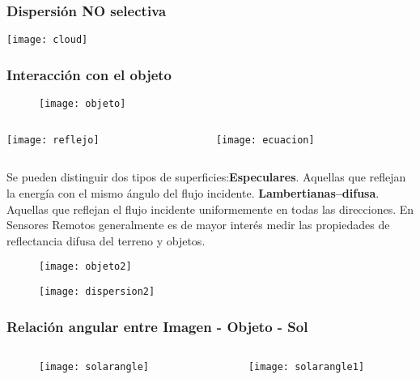 \documentclass[]{beamer}
\begin{document}
\begin{frame}
\frametitle{Dispersión NO selectiva}
\begin{center} 
\texttt{[image: cloud]}
\end{center}
\end{frame}
\begin{frame}
\frametitle{Interacción con el objeto}
  \begin{figure}
    \centering
    \texttt{[image: objeto]}
  \end{figure}
  \begin{columns}
	 	\begin{column}{.5\linewidth}
		 \texttt{[image: reflejo]}
		\end{column}
		\begin{column}{.5\linewidth}
		\texttt{[image: ecuacion]}
		\end{column}
	\end{columns}
\tiny{}
\end{frame}
\begin{frame}
\scriptsize{Se pueden distinguir dos tipos de superficies:\vfill\textbf{Especulares}. Aquellas que reflejan la energía con el mismo ángulo del flujo incidente.\vfill
\textbf{Lambertianas--difusa}.  Aquellas que reflejan el flujo incidente uniformemente en todas las direcciones. En Sensores Remotos generalmente es de mayor interés medir las propiedades de reflectancia difusa del terreno y objetos.} 
  \begin{figure}
    \centering
    \texttt{[image: objeto2]}
  \end{figure}
\tiny{}
\end{frame}
\begin{frame}
  \begin{figure}
    \centering
    \texttt{[image: dispersion2]}
  \end{figure}
\end{frame}
\begin{frame}
\frametitle{Relación angular entre Imagen - Objeto - Sol}
\begin{columns}
\begin{column}{0.5\linewidth}
  \begin{figure}
    \centering
    \texttt{[image: solarangle]}
  \end{figure}
  \end{column}
 \begin{column}{0.5\linewidth}
 \begin{figure}
    \centering
    \texttt{[image: solarangle1]}
  \end{figure} 
 \end{column}
  \end{columns}
\end{frame}
\end{document}
